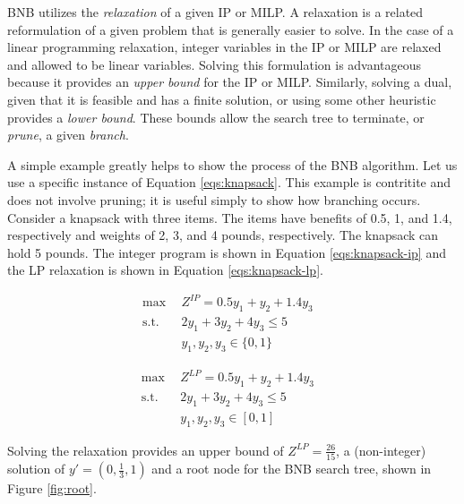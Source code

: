 BNB utilizes the \textit{relaxation} of a given IP or MILP. A relaxation is a
related reformulation of a given problem that is generally easier to solve. In
the case of a linear programming relaxation, integer variables in the IP or MILP
are relaxed and allowed to be linear variables. Solving this formulation is
advantageous because it provides an \textit{upper bound} for the IP or
MILP. Similarly, solving a dual, given that it is feasible and has a finite
solution, or using some other heuristic provides a \textit{lower bound}. These
bounds allow the search tree to terminate, or \textit{prune}, a
given \textit{branch}.

A simple example greatly helps to show the process of the BNB algorithm. Let us
use a specific instance of Equation \ref{eqs:knapsack}. This example is
contritite and does not involve pruning; it is useful simply to show how
branching occurs. Consider a knapsack with three items. The items have benefits
of 0.5, 1, and 1.4, respectively and weights of 2, 3, and 4 pounds,
respectively. The knapsack can hold 5 pounds. The integer program is shown in
Equation \ref{eqs:knapsack-ip} and the LP relaxation is shown in
Equation \ref{eqs:knapsack-lp}.

\begin{subequations}\label{eqs:knapsack-ip}
  \begin{align}
    \max \:\: & 
    Z^{IP} = 0.5 y_1 + y_2 + 1.4 y_3
    & \\
    \text{s.t.} \:\: &
    2y_1 + 3y_2 + 4y_3 \leq 5 
    & \\
    &
    y_1, y_2, y_3 \in \{ 0, 1 \}
  \end{align}
\end{subequations}

\begin{subequations}\label{eqs:knapsack-lp}
  \begin{align}
    \max \:\: & 
    Z^{LP} = 0.5 y_1 + y_2 + 1.4 y_3
    & \\
    \text{s.t.} \:\: &
    2y_1 + 3y_2 + 4y_3 \leq 5 
    & \\
    &
    y_1, y_2, y_3 \in [0, 1]
  \end{align}
\end{subequations}

Solving the relaxation provides an upper bound of $Z^{LP} = \frac{26}{15}$, a
(non-integer) solution of $y' = (0, \frac{1}{3}, 1)$ and a root node for the BNB
search tree, shown in Figure \ref{fig:root}.

